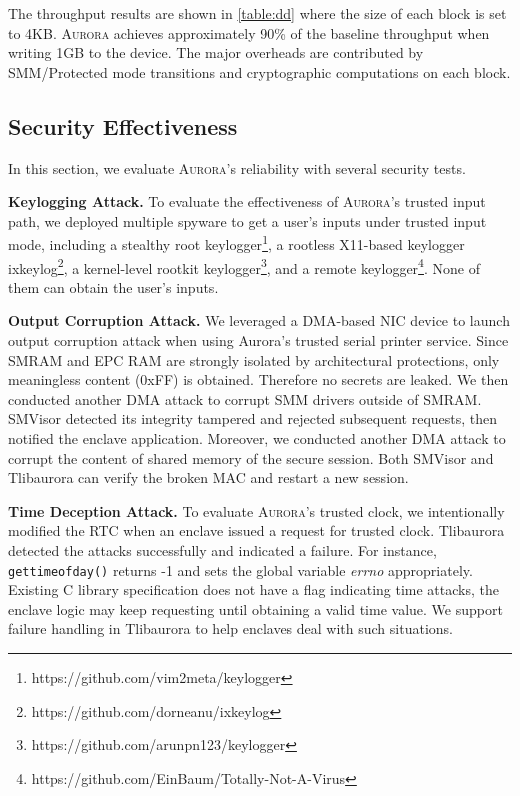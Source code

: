 The throughput results are shown in \autoref{table:dd} where the size of each block is set to 4KB. \textsc{Aurora} achieves approximately 90\% of the baseline throughput when writing 1GB to the device. The major overheads are contributed by SMM/Protected mode transitions and cryptographic computations on each block.

\subsection{Security Effectiveness}\label{security}
In this section, we evaluate \textsc{Aurora}'s reliability with several security tests.

\textbf{Keylogging Attack.}
To evaluate the effectiveness of \textsc{Aurora}'s trusted input path, we deployed multiple spyware to get a user's inputs under trusted input mode, including a stealthy root keylogger\footnote{https://github.com/vim2meta/keylogger}, a rootless X11-based keylogger ixkeylog\footnote{https://github.com/dorneanu/ixkeylog}, a kernel-level rootkit keylogger\footnote{https://github.com/arunpn123/keylogger}, and a remote keylogger\footnote{https://github.com/EinBaum/Totally-Not-A-Virus}. None of them can obtain the user's inputs.

\textbf{Output Corruption Attack.}
We leveraged a DMA-based NIC device to launch output corruption attack when using Aurora's trusted serial printer service. Since  SMRAM and EPC RAM are strongly isolated by architectural protections, only meaningless content (0xFF) is obtained. Therefore no secrets are leaked. We then conducted another DMA attack to corrupt SMM drivers outside of SMRAM. SMVisor detected its integrity tampered  and rejected subsequent requests, then notified the enclave application. Moreover, we conducted another DMA attack to corrupt the content of shared memory of the secure session. Both SMVisor and Tlibaurora can verify the broken MAC and restart a new session.

\textbf{Time Deception Attack.}
To evaluate \textsc{Aurora}’s trusted clock, we intentionally modified the RTC when an enclave issued a request for trusted clock. Tlibaurora detected the attacks successfully and indicated a failure. For instance, \texttt{gettimeofday()} returns -1 and sets the global variable \textit{errno} appropriately. Existing C library specification does not have a flag indicating time attacks, the enclave logic may keep requesting until obtaining a valid time value. We support failure handling in Tlibaurora to help enclaves deal with such situations.


